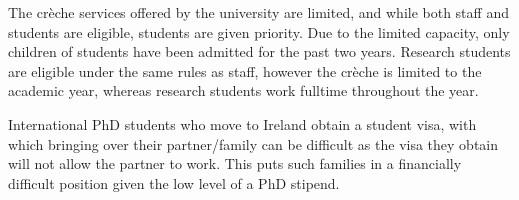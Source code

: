 The cr\`{e}che services offered by the university are limited, and while both staff and students are eligible, students are given priority. Due to the limited capacity,  only children of students have been admitted for the past two years. Research students are eligible under the same rules as staff, however the cr\`{e}che is limited to the academic year, whereas research students work fulltime throughout the year.

International PhD students who move to Ireland obtain a student visa, with which bringing over their partner/family can be difficult as the visa they obtain will not allow the partner to work. This puts such families in a financially difficult position given the low level of a PhD stipend. 

